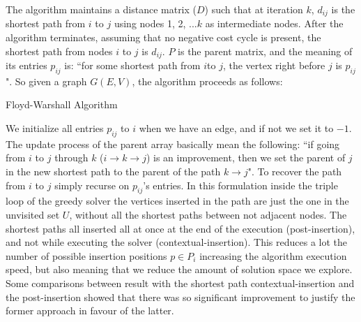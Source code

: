 The algorithm maintains a distance matrix ($D$) such that at iteration $k$, $d_{ij}$ is the shortest path from $i$ to $j$ using nodes 1, 2, ...$k$ as intermediate nodes. After the algorithm terminates, assuming that no negative cost cycle is present, the shortest path from nodes $i$ to $j$ is $d_{ij}$. $P$ is the parent matrix, and the meaning of its entries $p_{ij}$ is: ``for some shortest path from $i$to $j$, the vertex right before $j$ is $p_{ij}$". So given a graph $G(E,V)$, the algorithm proceeds as follows:

\begin{algorithm}[ht]
\begin{algorithmic}[1]

 \label{fw_initD}
 \label{fw_initP}
 \label{fw_initFor_i1}
   \label{fw_initFor_j1}
    \relax
    \ELSE
    \ENDIF
  \ENDFOR
\ENDFOR
{} \label{fw_initFor_i2}
       \label{fw_initFor_j2}
	   \label{fw_initFor_k2}
	    \ENDIF
	  \ENDFOR
      \ENDFOR
\ENDFOR
{} \label{a:return_D}
\end{algorithmic}
\caption{Floyd-Warshall Algorithm}\label{alg:floydWarsh}
\end{algorithm}

We initialize all entries $p_{ij}$  to $i$ when we have an edge, and if not we set it to $-1$. The update process of the parent array basically mean the following: ``if going from $i$ to $j$ through $k$ ($i \rightarrow k \rightarrow j$) is an improvement, then we set the parent of $j$ in the new shortest path to the parent of the path $k  \rightarrow j$". To recover the path from $i$ to $j$ simply recurse on $p_{ij}$'s entries.
In this formulation inside the triple loop of the greedy solver the vertices inserted in the path are just the one in the unvisited set $U$, without all the shortest paths between not adjacent nodes. The shortest paths all inserted all at once at the end of the execution (post-insertion), and not while executing the solver (contextual-insertion). This reduces a lot the number of possible insertion positions $p \in P_i$ increasing the algorithm execution speed, but also meaning that we reduce the amount of solution space we explore. Some comparisons between result with the shortest path contextual-insertion and the post-insertion showed that there was so significant improvement to justify the former approach in favour of the latter.

